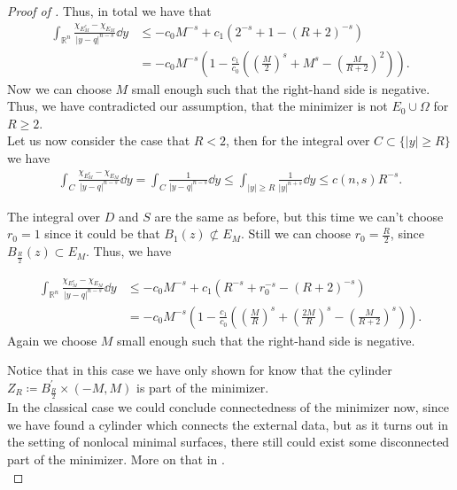 \begin{proof}[Proof of ]
	Thus, in total we have that
	\begin{align*}
		\int_{\mathbb{R}^n} \frac{\chi_{E_M^c} - \chi_{E_M}}{\lvert y - q \rvert^{n - s}} \dd{y}
		 & \leq - c_0 M^{- s} + c_1 (2^{- s} + 1 - {(R + 2)}^{- s}) \\
		 & = - c_0 M^{- s} \left(1 - \frac{c_1}{c_0} \left({\left(\frac{M}{2}\right)}^s + M^s - {\left(\frac{M}{R + 2}\right)}^2\right)\right).
	\end{align*}
	Now we can choose \( M \) small enough such that the right-hand side is negative. Thus, we have
	contradicted our assumption, that the minimizer is not \( E_0 \cup \Omega \) for \( R \geq 2 \). \\

	Let us now consider the case that \( R < 2 \), then for the integral over \( C \subset \{\lvert y
	\rvert \geq R \} \) we have
	\begin{align*}
		\int_C \frac{\chi_{E_M^c} - \chi_{E_M}}{\lvert y - q \rvert^{n - s}} \dd{y}
		= \int_C \frac{1}{\lvert y - q \rvert^{n - s}} \dd{y}
		\leq \int_{\lvert y \rvert \geq R} \frac{1}{\lvert y \rvert^{n + s}} \dd{y}
		\leq c(n, s) R^{- s}.
	\end{align*}

	The integral over \( D \) and \( S \) are the same as before, but this time we can't choose \( r_0
	= 1 \) since it could be that \( B_1 (z) \not\subset E_M \). Still we can choose \( r_0 =
	\frac{R}{2} \), since \( B_{\frac{R}{2}} (z) \subset E_M \). Thus, we have

	\begin{align*}
		\int_{\mathbb{R}^n} \frac{\chi_{E_M^c} - \chi_{E_M}}{\lvert y - q \rvert^{n - s}} \dd{y}
		 & \leq - c_0 M^{-s} + c_1 (R^{-s} + r_0^{-s} - {(R + 2)}^{-s}) \\
		 & = - c_0 M^{-s} \left(1 - \frac{c_1}{c_0} \left({\left(\frac{M}{R}\right)}^s + {\left(\frac{2M}{R}\right)}^s - {\left(\frac{M}{R + 2}\right)}^s\right)\right).
	\end{align*}
	Again we choose \( M \) small enough such that the right-hand side is negative.

	Notice that in this case we have only shown for know that the cylinder \( Z_R \coloneqq
	B^\prime_{\frac{R}{2}} \times(- M, M) \) is part of the minimizer. \\
	In the classical case we could conclude connectedness of the minimizer now, since we have found a
	cylinder which connects the external data, but as it turns out in the setting of nonlocal minimal
	surfaces, there still could exist some disconnected part of the minimizer. More on that in
	. \\


\end{proof}
